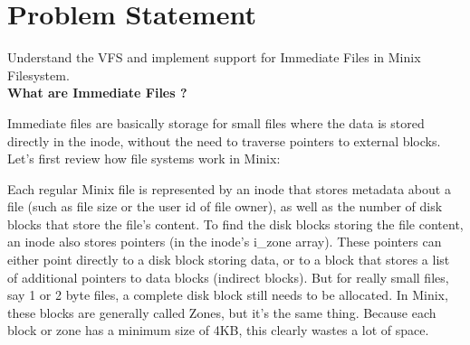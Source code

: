 \chapter{Problem Statement}

\vspace{10mm}

\large Understand the VFS and implement support for Immediate Files in Minix Filesystem. \\

\textbf{What are Immediate Files ?}

Immediate files are basically storage for small files where the data is stored directly in the inode, without the need to traverse pointers to external blocks. Let's first review how file systems work in Minix:

Each regular Minix file is represented by an inode that stores metadata about a file (such as file size or the user id of file owner), as well as the number of disk blocks that store the file's content. To find the disk blocks storing the file content, an inode also stores pointers (in the inode's i\_zone array). These pointers can either point directly to a disk block storing data, or to a block that stores a list of additional pointers to data blocks (indirect blocks). But for really small files, say 1 or 2 byte files, a complete disk block still needs to be allocated. In Minix, these blocks are generally called Zones, but it's the same thing. Because each block or zone has a minimum size of 4KB, this clearly wastes a lot of space.


